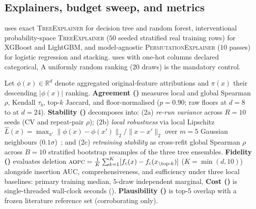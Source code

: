 \subsection{Explainers, budget sweep, and metrics}\label{sec:method-metrics}
\shap{} uses exact \textsc{TreeExplainer} for decision tree and random forest,
interventional probability-space \textsc{TreeExplainer} ($50$ seeded stratified real
training rows) for XGBoost and LightGBM, and model-agnostic \textsc{PermutationExplainer}
($10$ passes) for logistic regression and stacking. \lime{} uses
 with one-hot columns declared categorical,
 A uniformly random ranking ($20$ draws) is the
mandatory control.

Let $\phi(x)\in\mathbb{R}^{d}$ denote aggregated original-feature attributions and $\pi(x)$
their descending $|\phi(x)|$ ranking. \textbf{Agreement ()} measures local and global
Spearman $\rho$, Kendall $\tau_b$, top-$k$ Jaccard, and floor-normalised \rbo{} ($p=0.90$;
raw floors \RboFloorEight{} at $d=8$ to \RboFloorTwentyFour{} at $d=24$).  \textbf{Stability ()} decomposes into: (2a) \emph{re-run variance}
across $R=10$ seeds (CV and repeat-pair $\rho$); (2b) \emph{local robustness} via local
Lipschitz $\hat{L}(x)=\max_{x'}\lVert\phi(x)-\phi(x')\rVert_2/\lVert x-x'\rVert_2$ over
$m=5$ Gaussian neighbours ($0.1\sigma$)~\cite{alvarezmelis2018robustness}; and (2c)
\emph{retraining stability} as cross-refit global Spearman $\rho$ across $B=10$ stratified
bootstrap resamples of the three tree ensembles. \textbf{Fidelity ()} evaluates
deletion $\textsc{aopc}{}=\frac{1}{K}\sum_{k=1}^{K}[f_c(x)-f_c(x_{\setminus\text{top-}k})]$
($K=\min(d,10)$) alongside insertion AUC, comprehensiveness, and
sufficiency under three local baselines: primary training median,
$5$-draw independent marginal,  \textbf{Cost ()} is single-threaded wall-clock seconds
(). \textbf{Plausibility ()} is top-5 overlap with a
frozen literature reference set (corroborating only).

